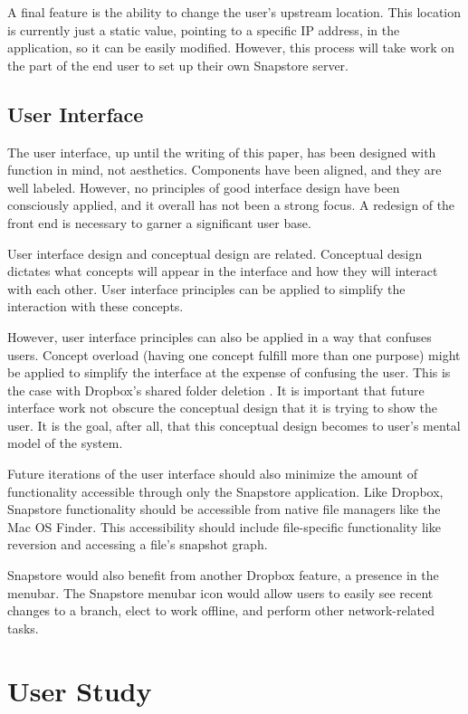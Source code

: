 A final feature is the ability to change the user's upstream location. This location is currently just a static value, pointing to a specific IP address, in the application, so it can be easily modified. However, this process will take work on the part of the end user to set up their own Snapstore server.

\subsection{User Interface}

The user interface, up until the writing of this paper, has been designed with function in mind, not aesthetics. Components have been aligned, and they are well labeled. However, no principles of good interface design have been consciously applied, and it overall has not been a strong focus. A redesign of the front end is necessary to garner a significant user base.

User interface design and conceptual design are related. Conceptual design dictates what concepts will appear in the interface and how they will interact with each other. User interface principles can be applied to simplify the interaction with these concepts. 

However, user interface principles can also be applied in a way that confuses users. Concept overload (having one concept fulfill more than one purpose) might be applied to simplify the interface at the expense of confusing the user. This is the case with Dropbox's shared folder deletion \cite{Zhang}. It is important that future interface work not obscure the conceptual design that it is trying to show the user. It is the goal, after all, that this conceptual design becomes to user's mental model of the system.

Future iterations of the user interface should also minimize the amount of functionality accessible through only the Snapstore application. Like Dropbox, Snapstore functionality should be accessible from native file managers like the Mac OS Finder. This accessibility should include file-specific functionality like reversion and accessing a file's snapshot graph.

Snapstore would also benefit from another Dropbox feature, a presence in the menubar. The Snapstore menubar icon would allow users to easily see recent changes to a branch, elect to work offline, and perform other network-related tasks.

\section{User Study}

